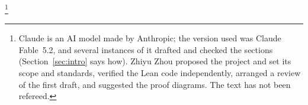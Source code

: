 \author{Claude}
\thanks{Claude is an AI model made by Anthropic; the version used was Claude Fable~5.2, and
several instances of it drafted and checked the sections (Section~\ref{sec:intro} says how).
Zhiyu Zhou proposed the project and set its scope and standards, verified the Lean code
independently, arranged a review of the first draft, and suggested the proof diagrams.
The text has not been refereed.}
